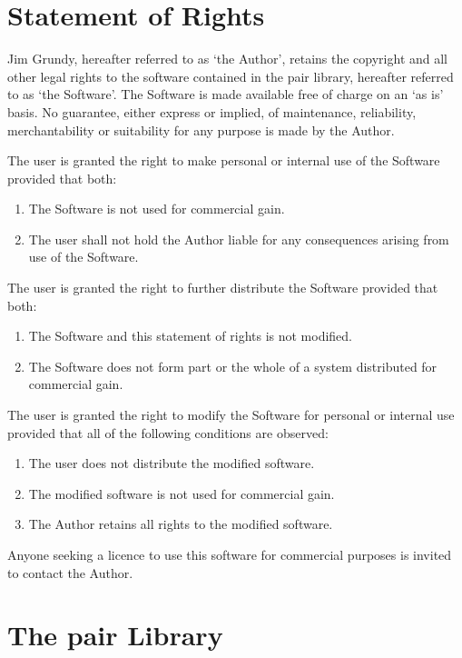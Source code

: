 \chapter{Statement of Rights}

Jim Grundy, hereafter referred to as `the Author', retains the
copyright and all other legal rights to the software contained in
the pair library, hereafter referred to as `the Software'.
The Software is made available free of charge on an `as is' basis.
No guarantee, either express or implied, of maintenance, reliability,
merchantability or suitability for any purpose is made by the Author.

The user is granted the right to make personal or internal use
of the Software provided that both:
\begin{enumerate}
    \item   The Software is not used for commercial gain.
    \item   The user shall not hold the Author liable for any consequences
            arising from use of the Software.
\end{enumerate}
The user is granted the right to further distribute the Software
provided that both:
\begin{enumerate}
    \item   The Software and this statement of rights is not modified.
    \item   The Software does not form part or the whole of a system
            distributed for commercial gain.
\end{enumerate}
The user is granted the right to modify the Software for personal or
internal use provided that all of the following conditions are
observed:
\begin{enumerate}
    \item   The user does not distribute the modified software.
    \item   The modified software is not used for commercial gain.
    \item   The Author retains all rights to the modified software.
\end{enumerate}

Anyone seeking a licence to use this software for commercial purposes
is invited to contact the Author.

\chapter{The pair Library}

